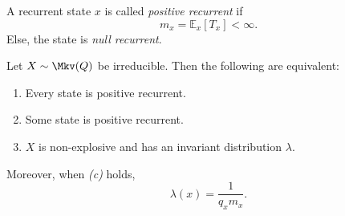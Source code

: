 \documentclass[12pt]{article}
\begin{document}
\begin{definition}
	A recurrent state $x$ is called \emph{positive recurrent} if
	\[
	m_x = \mathbb{E}_x[T_x] < \infty
	.\]
	Else, the state is \emph{null recurrent}.
\end{definition}

\begin{theorem}
	Let $X \sim \Mkv(Q)$ be irreducible. Then the following are equivalent:
	\begin{enumerate}[\normalfont(a)]
		\item Every state is positive recurrent.
		\item Some state is positive recurrent.
		\item $X$ is non-explosive and has an invariant distribution $\lambda$.
	\end{enumerate}
	Moreover, when \emph{(c)} holds,
	\[
	\lambda(x) = \frac{1}{q_x m_x}
	.\]
\end{theorem}
\end{document}
